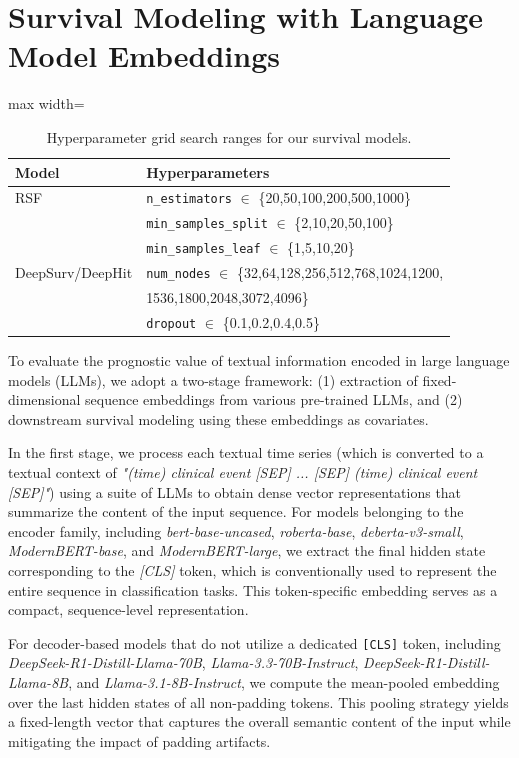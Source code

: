 \section{Survival Modeling with Language Model Embeddings}
\label{apd:encoder-survival}

\begin{table}[b]
\centering
\begin{adjustbox}{max width=\columnwidth}
\begin{tabular}{ll}
\toprule
\textbf{Model} & \textbf{Hyperparameters} \\
\midrule
RSF & \texttt{n\_estimators} $\in$ \{20,50,100,200,500,1000\} \\
    & \texttt{min\_samples\_split} $\in$ \{2,10,20,50,100\} \\
    & \texttt{min\_samples\_leaf} $\in$ \{1,5,10,20\} \\
DeepSurv/DeepHit & \texttt{num\_nodes} $\in$ \{32,64,128,256,512,768,1024,1200,\\
& 1536,1800,2048,3072,4096\} \\
    & \texttt{dropout} $\in$ \{0.1,0.2,0.4,0.5\} \\
\bottomrule
\end{tabular}
\end{adjustbox}
\caption{Hyperparameter grid search ranges for our survival models.}
\label{tab:hyperparams}
\end{table}

To evaluate the prognostic value of textual information encoded in large language models (LLMs), we adopt a two-stage framework: (1) extraction of fixed-dimensional sequence embeddings from various pre-trained LLMs, and (2) downstream survival modeling using these embeddings as covariates.

In the first stage, we process each textual time series (which is converted to a textual context of \emph{"(time) clinical event [SEP] ... [SEP] (time) clinical event [SEP]"}) using a suite of LLMs to obtain dense vector representations that summarize the content of the input sequence. 
For models belonging to the encoder family, including \textit{bert-base-uncased}, \textit{roberta-base}, \textit{deberta-v3-small}, \textit{ModernBERT-base}, and \textit{ModernBERT-large}, we extract the final hidden state corresponding to the \textit{[CLS]} token, which is conventionally used to represent the entire sequence in classification tasks. 
This token-specific embedding serves as a compact, sequence-level representation.

For decoder-based models that do not utilize a dedicated \texttt{[CLS]} token, including \textit{DeepSeek-R1-Distill-Llama-70B}, \textit{Llama-3.3-70B-Instruct}, \textit{DeepSeek-R1-Distill-Llama-8B}, and \textit{Llama-3.1-8B-Instruct}, we compute the mean-pooled embedding over the last hidden states of all non-padding tokens. 
This pooling strategy yields a fixed-length vector that captures the overall semantic content of the input while mitigating the impact of padding artifacts.

